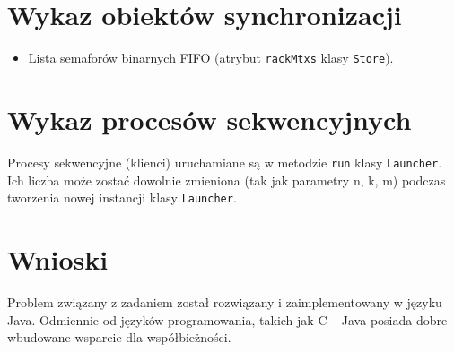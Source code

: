 \documentclass[titlepage]{article}
\begin{document}
\section{Wykaz obiektów synchronizacji}
\begin{itemize}
	\item Lista semaforów binarnych FIFO (atrybut \texttt{rackMtxs} klasy \texttt{Store}).
\end{itemize}

\section{Wykaz procesów sekwencyjnych}
Procesy sekwencyjne (klienci) uruchamiane są w metodzie \texttt{run} klasy \texttt{Launcher}.
Ich liczba może zostać dowolnie zmieniona (tak jak parametry n, k, m) podczas tworzenia nowej instancji klasy \texttt{Launcher}.

\section{Wnioski}
Problem związany z zadaniem został rozwiązany i zaimplementowany w języku Java.
Odmiennie od języków programowania, takich jak C -- Java posiada dobre wbudowane wsparcie dla współbieżności.
\end{document}
